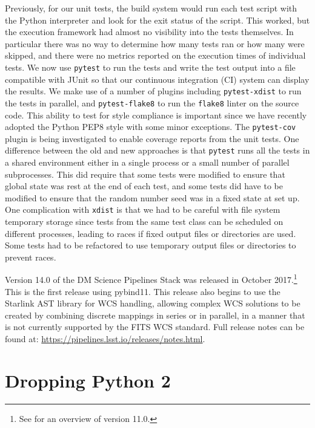 \documentclass[11pt,twoside]{article}
\begin{document}
Previously, for our unit tests, the build system would run each test script with the Python interpreter and look for the exit status of the script.
This worked, but the execution framework had almost no visibility into the tests themselves.
In particular there was no way to determine how many tests ran or how many were skipped, and there were no metrics reported on the execution times of individual tests.
We now use \texttt{pytest} to run the tests and write the test output into a file compatible with JUnit so that our continuous integration (CI) system can display the results.
We make use of a number of plugins including \texttt{pytest-xdist} to run the tests in parallel, and \texttt{pytest-flake8} to run the \texttt{flake8} linter on the source code.
This ability to test for style compliance is important since we have recently adopted the Python PEP8 style with some minor exceptions.
The \texttt{pytest-cov} plugin is being investigated to enable coverage reports from the unit tests.
One difference between the old and new approaches is that \texttt{pytest} runs all the tests in a shared environment either in a single process or a small number of parallel subprocesses.
This did require that some tests were modified to ensure that global state was rest at the end of each test, and some tests did have to be modified to ensure that the random number seed was in a fixed state at set up.
One complication with \texttt{xdist} is that we had to be careful with file system temporary storage since tests from the same test class can be scheduled on different processes, leading to races if fixed output files or directories are used.
Some tests had to be refactored to use temporary output files or directories to prevent races.

Version 14.0 of the DM Science Pipelines Stack was released in October 2017.\footnote{See \citet{P056_adassxxv} for an overview of version 11.0.}
This is the first release using pybind11.
This release also begins to use the Starlink AST library \citep{2016A&C....15...33B} for WCS handling, allowing complex WCS solutions to be created by combining discrete mappings in series or in parallel, in a manner that is not currently supported by the FITS WCS standard.
Full release notes can be found at: \url{https://pipelines.lsst.io/releases/notes.html}.

\section{Dropping Python 2}
\end{document}
